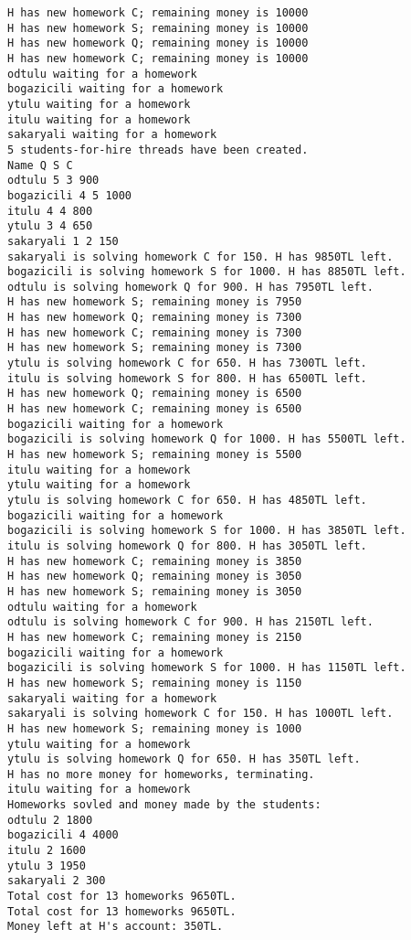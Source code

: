 \documentclass[a4paper]{article}
\begin{document}
\begin{verbatim}
H has new homework C; remaining money is 10000
H has new homework S; remaining money is 10000
H has new homework Q; remaining money is 10000
H has new homework C; remaining money is 10000
odtulu waiting for a homework
bogazicili waiting for a homework
ytulu waiting for a homework
itulu waiting for a homework
sakaryali waiting for a homework
5 students-for-hire threads have been created.
Name Q S C
odtulu 5 3 900
bogazicili 4 5 1000
itulu 4 4 800
ytulu 3 4 650
sakaryali 1 2 150
sakaryali is solving homework C for 150. H has 9850TL left.
bogazicili is solving homework S for 1000. H has 8850TL left.
odtulu is solving homework Q for 900. H has 7950TL left.
H has new homework S; remaining money is 7950
H has new homework Q; remaining money is 7300
H has new homework C; remaining money is 7300
H has new homework S; remaining money is 7300
ytulu is solving homework C for 650. H has 7300TL left.
itulu is solving homework S for 800. H has 6500TL left.
H has new homework Q; remaining money is 6500
H has new homework C; remaining money is 6500
bogazicili waiting for a homework
bogazicili is solving homework Q for 1000. H has 5500TL left.
H has new homework S; remaining money is 5500
itulu waiting for a homework
ytulu waiting for a homework
ytulu is solving homework C for 650. H has 4850TL left.
bogazicili waiting for a homework
bogazicili is solving homework S for 1000. H has 3850TL left.
itulu is solving homework Q for 800. H has 3050TL left.
H has new homework C; remaining money is 3850
H has new homework Q; remaining money is 3050
H has new homework S; remaining money is 3050
odtulu waiting for a homework
odtulu is solving homework C for 900. H has 2150TL left.
H has new homework C; remaining money is 2150
bogazicili waiting for a homework
bogazicili is solving homework S for 1000. H has 1150TL left.
H has new homework S; remaining money is 1150
sakaryali waiting for a homework
sakaryali is solving homework C for 150. H has 1000TL left.
H has new homework S; remaining money is 1000
ytulu waiting for a homework
ytulu is solving homework Q for 650. H has 350TL left.
H has no more money for homeworks, terminating.
itulu waiting for a homework
Homeworks sovled and money made by the students:
odtulu 2 1800
bogazicili 4 4000
itulu 2 1600
ytulu 3 1950
sakaryali 2 300
Total cost for 13 homeworks 9650TL.
Total cost for 13 homeworks 9650TL.
Money left at H's account: 350TL.
\end{verbatim}
\end{document}
